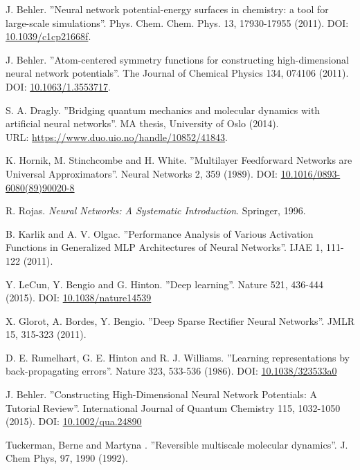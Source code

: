 \documentclass[twoside,english]{uiofysmaster}
\begin{document}
\begin{thebibliography}{56}

 J. Behler.
 ''Neural network potential-energy surfaces in chemistry: a tool for large-scale simulations''.
 Phys. Chem. Chem. Phys. 13, 17930-17955 (2011). 
 DOI: \href{http://dx.doi.org/10.1039/c1cp21668f}{10.1039/c1cp21668f}. 
 
 J. Behler.
 ''Atom-centered symmetry functions for constructing high-dimensional neural network potentials''.
 The Journal of Chemical Physics 134, 074106 (2011). 
 DOI: \href{http://dx.doi.org/10.1063/1.3553717}{10.1063/1.3553717}.
 
 S. A. Dragly.
 ''Bridging quantum mechanics and molecular dynamics with artificial neural networks''.
 MA thesis, University of Oslo (2014). \\
 URL: \href{https://www.duo.uio.no/handle/10852/41843}{https://www.duo.uio.no/handle/10852/41843}.

 K. Hornik, M. Stinchcombe and H. White.
 ''Multilayer Feedforward Networks are Universal Approximators''.
 Neural Networks 2, 359 (1989). 
 DOI: \href{https://doi.org/10.1016/0893-6080(89)90020-8}{10.1016/0893-6080(89)90020-8}
 
 R. Rojas. 
 \textit{Neural Networks: A Systematic Introduction}.
 Springer, 1996.
 
 B. Karlik and A. V. Olgac.
 ''Performance Analysis of Various Activation Functions in Generalized MLP Architectures of Neural Networks''.
 IJAE 1, 111-122 (2011).
 
 Y. LeCun, Y. Bengio and G. Hinton.
 ''Deep learning''.
 Nature 521, 436-444 (2015). 
 DOI: \href{http://dx.doi.org/10.1038/nature14539}{10.1038/nature14539}
 
 X. Glorot, A. Bordes, Y. Bengio.
 ''Deep Sparse Rectifier Neural Networks''.
 JMLR 15, 315-323 (2011).
 
 D. E. Rumelhart, G. E. Hinton and R. J. Williams.
 ''Learning representations by back-propagating errors''.
 Nature 323, 533-536 (1986).
 DOI: \href{http://dx.doi.org/10.1038/323533a0}{10.1038/323533a0}
 
 J. Behler.
 ''Constructing High-Dimensional Neural Network Potentials: A Tutorial Review''.
 International Journal of Quantum Chemistry 115, 1032-1050 (2015).
 DOI: \href{http://dx.doi.org/10.1002/qua.24890}{10.1002/qua.24890}
 
 Tuckerman, Berne and Martyna .
 ''Reversible multiscale molecular dynamics''.
 J. Chem Phys, 97, 1990 (1992).
 
\end{thebibliography}
\end{document}

